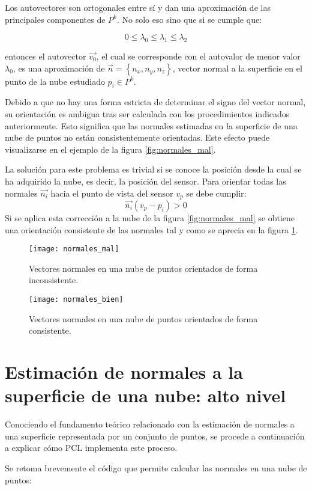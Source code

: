 Los autovectores son ortogonales entre sí y dan una aproximación de las principales componentes de $P^k$. No solo eso sino que si se cumple que:
 
 $$0\leq\lambda_0\leq\lambda_1\leq\lambda_2$$

entonces el autovector $\vec{v_0}$, el cual se corresponde con el autovalor de menor valor $\lambda_0$, es una aproximación de $\vec{n}= \left\lbrace n_x,n_y,n_z\right\rbrace$, vector normal a la superficie en el punto de la nube estudiado $p_i \in P^k$.


Debido a que no hay una forma estricta de determinar el signo del vector normal, su orientación es ambigua tras ser calculada con los procedimientos indicados anteriormente. Esto significa que las normales estimadas en la superficie de una nube de puntos no están consistentemente orientadas. Este efecto puede visualizarse en el ejemplo de la figura \ref{fig:normales_mal}.

La solución para este problema es trivial si se conoce la posición desde la cual se ha adquirido la nube, es decir, la posición del sensor. Para orientar todas las normales $\vec{n_i}$ hacia el punto de vista del sensor $v_p$ se debe cumplir:
$$\vec{n_i}(v_p-p_i)>0$$
Si se aplica esta corrección a la nube de la figura \ref{fig:normales_mal} se obtiene una orientación consistente de las normales tal y como se aprecia en la figura \ref{fig:normales_bien}.

\begin{figure}[!htb]
  \texttt{[image: normales\_mal]}
  \caption{Vectores normales en una nube de puntos orientados de forma inconsistente.}\label{fig:normales_mal}
\endminipage\hfill
{}
  \texttt{[image: normales\_bien]}
  \caption{Vectores normales en una nube de puntos orientados de forma consistente.}\label{fig:normales_bien}
\endminipage\hfill
\end{figure}


\section{Estimación de normales a la superficie de una nube: alto nivel}
Conociendo el fundamento teórico relacionado con la estimación de normales a una superficie representada por un conjunto de puntos, se procede a continuación a explicar cómo PCL implementa este proceso.

Se retoma brevemente el código que permite calcular las normales en una nube de puntos:

